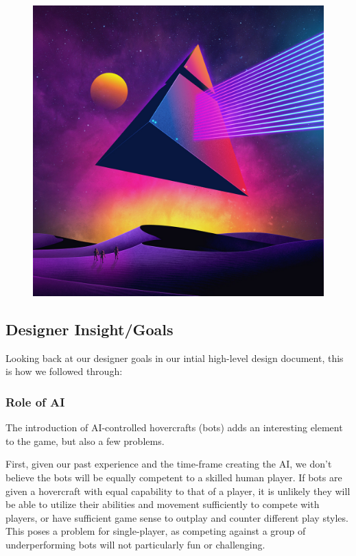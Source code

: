 \documentclass{article}
\theoremstyle{definition}
\begin{document}
\begin{figure}[htpb]
  \centering
  \includegraphics[width=0.8\linewidth]{images/art/start_menu4.jpg}
  \caption{}
\label{fig:theme02}
\end{figure}

\subsection{Designer Insight/Goals}

Looking back at our designer goals in our intial high-level design document, this is how we followed through:

\subsubsection{Role of AI}

The introduction of AI-controlled hovercrafts (bots) adds an interesting
element to the game, but also a few problems.

First, given our past experience and the time-frame creating the AI, we don't
believe the bots will be equally competent to a skilled human player. If bots
are given a hovercraft with equal capability to that of a player, it is
unlikely they will be able to utilize their abilities and movement sufficiently
to compete with players, or have sufficient game sense to outplay and counter
different play styles. This poses a problem for single-player, as competing
against a group of underperforming bots will not particularly fun or
challenging.
\end{document}
